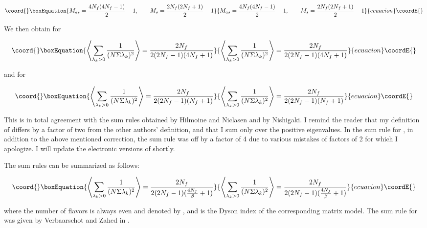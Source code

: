 \documentclass[a4paper,10pt]{article}
\begin{document}
\begin{equation}\coord{}\boxEquation{
M_{as}=\frac{4N_f(4N_f-1)}{2} - 1, \ \ \ \ \ \ M_s=\frac{2N_f(2N_f+1)}{2} - 1
}{
M_{as}=\frac{4N_f(4N_f-1)}{2} - 1, \ \ \ \ \ \ M_s=\frac{2N_f(2N_f+1)}{2} - 1
}{ecuacion}\coordE{}\end{equation}

We then obtain for \coordHE{} 

\begin{equation}\coord{}\boxEquation{
\left\langle \sum_{\lambda_k > 0} 
\frac{1}{(N\Sigma \lambda_k)^2} \right\rangle = \frac{2N_f}{2(2N_f-1)(4N_f+1)}
}{
\left\langle \sum_{\lambda_k > 0} 
\frac{1}{(N\Sigma \lambda_k)^2} \right\rangle = \frac{2N_f}{2(2N_f-1)(4N_f+1)}
}{ecuacion}\coordE{}\end{equation}

and for \coordHE{} 

\begin{equation}\coord{}\boxEquation{
\left\langle \sum_{\lambda_k > 0} 
\frac{1}{(N\Sigma \lambda_k)^2} \right\rangle = \frac{2N_f}{2(2N_f-1)(N_f+1)}
}{
\left\langle \sum_{\lambda_k > 0} 
\frac{1}{(N\Sigma \lambda_k)^2} \right\rangle = \frac{2N_f}{2(2N_f-1)(N_f+1)}
}{ecuacion}\coordE{}\end{equation}

This is in total agreement with the sum rules obtained by Hilmoine and 
Niclasen and by Nishigaki. I remind the reader that my definition of
\coordHE{} differs by a factor of two from the other authors' definition, and that 
I sum only over the positive eigenvalues.
In the sum rule for \coordHE{}, in addition to the above mentioned 
correction, the sum rule was off by a factor of 4 due to various mistakes
of factors of 2 for which I apologize. I will
update the electronic versions of \cite{QCD3_1,QCD3_2} shortly.

The \coordHE{} sum rules can be summarized as follows:

\begin{equation}\coord{}\boxEquation{
\left\langle \sum_{\lambda_k > 0} 
\frac{1}{(N\Sigma \lambda_k)^2} \right\rangle = \frac{2N_f}{2(2N_f-1)
(\frac{4N_f}{\beta }+1)}
}{
\left\langle \sum_{\lambda_k > 0} 
\frac{1}{(N\Sigma \lambda_k)^2} \right\rangle = \frac{2N_f}{2(2N_f-1)
(\frac{4N_f}{\beta }+1)}
}{ecuacion}\coordE{}\end{equation}

where the number of flavors is always even and denoted by \coordHE{}, and 
\myHighlight{$\beta $}\coordHE{} is the Dyson index of the corresponding matrix model.
The sum rule for \coordHE{} was given by Verbaarschot and Zahed in \cite{V25}.
\vskip5mm
\end{document}
